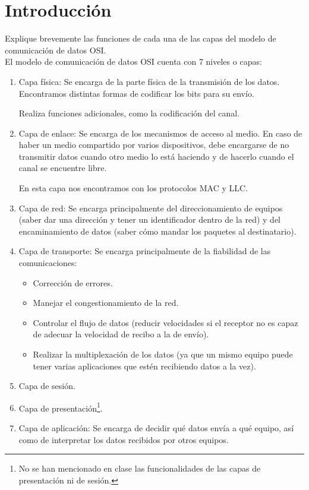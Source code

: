 \chapter{Introducción}

\begin{ejercicio}
   Explique brevemente las funciones de cada una de las capas del modelo de comunicación de datos OSI\@. \\

   El modelo de comunicación de datos OSI cuenta con 7 niveles o capas:
   \begin{enumerate}
       \item Capa física: Se encarga de la parte física de la transmisión de los datos. Encontramos distintas formas de codificar los bits para su envío. 

           Realiza funciones adicionales, como la codificación del canal.
       \item Capa de enlace: Se encarga de los mecanismos de acceso al medio. En caso de haber un medio compartido por varios dispositivos, debe encargarse de no transmitir datos cuando otro medio lo está haciendo y de hacerlo cuando el canal se encuentre libre.

           En esta capa nos encontramos con los protocolos MAC y LLC\@.
       \item Capa de red: Se encarga principalmente del direccionamiento de equipos (saber dar una dirección y tener un identificador dentro de la red) y del encaminamiento de datos (saber cómo mandar los paquetes al destinatario).
       \item Capa de transporte: Se encarga principalmente de la fiabilidad de las comunicaciones:
           \begin{itemize}
               \item Corrección de errores.
               \item Manejar el congestionamiento de la red.
               \item Controlar el flujo de datos (reducir velocidades si el receptor no es capaz de adecuar la velocidad de recibo a la de envío).
               \item Realizar la multiplexación de los datos (ya que un mismo equipo puede tener varias aplicaciones que estén recibiendo datos a la vez).
           \end{itemize}

       \item Capa de sesión.
        \item Capa de presentación\footnote{No se han mencionado en clase las funcionalidades de las capas de presentación ni de sesión.}.
        \item Capa de aplicación: Se encarga de decidir qué datos envía a qué equipo, así como de interpretar los datos recibidos por otros equipos.
   \end{enumerate}
\end{ejercicio}

